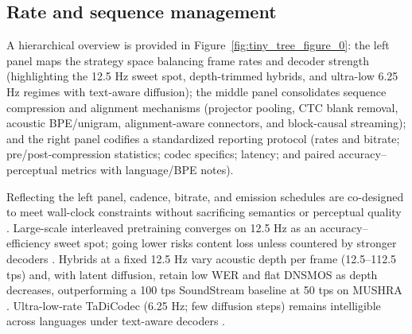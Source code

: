 \documentclass{article}
\begin{document}
\subsection{Rate and sequence management} \label{subsec:rateandsequencemanagement}
A hierarchical overview is provided in Figure~\ref{fig:tiny_tree_figure_0}: the left panel maps the strategy space balancing frame rates and decoder strength (highlighting the 12.5 Hz sweet spot, depth-trimmed hybrids, and ultra-low 6.25 Hz regimes with text-aware diffusion); the middle panel consolidates sequence compression and alignment mechanisms (projector pooling, CTC blank removal, acoustic BPE/unigram, alignment-aware connectors, and block-causal streaming); and the right panel codifies a standardized reporting protocol (rates and bitrate; pre/post-compression statistics; codec specifics; latency; and paired accuracy--perceptual metrics with language/BPE notes).

Reflecting the left panel, cadence, bitrate, and emission schedules are co-designed to meet wall-clock constraints without sacrificing semantics or perceptual quality \cite{zhao2024textlessstreamingspeechtranslationsemant,liu2024analyzingmitigatinginconsistencydiscrete,zhang2025impactframeratesspeechtokenizercasestudy,huang2024repcodecspeechrepresentationcodectokeniz}. Large-scale interleaved pretraining converges on 12.5 Hz as an accuracy--efficiency sweet spot; going lower risks content loss unless countered by stronger decoders \cite{zeng2024scalingspeechtextpretrainingsyntheticint}. Hybrids at a fixed 12.5 Hz vary acoustic depth per frame (12.5--112.5 tps) and, with latent diffusion, retain low WER and flat DNSMOS as depth decreases, outperforming a 100 tps SoundStream baseline at 50 tps on MUSHRA \cite{yang2025diffsoundstreamefficientspeechtokenizati}. Ultra-low-rate TaDiCodec (6.25 Hz; few diffusion steps) remains intelligible across languages under text-aware decoders \cite{wang2025tadicodectextawarediffusionspeechtokeniz}.
\end{document}
